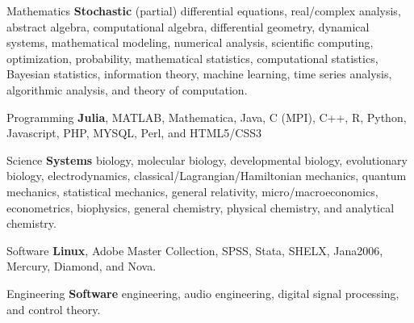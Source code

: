 

\begin{cvskills}
  
  \cvskill
  {Mathematics} %
  {{\bf \color{awesome} Stochastic}  (partial) differential equations, real/complex analysis,
  	abstract algebra, computational algebra, differential geometry, dynamical systems, mathematical modeling, numerical analysis, scientific computing, optimization, probability, mathematical statistics, computational statistics, Bayesian statistics, information theory, machine learning, time series analysis, algorithmic analysis, and theory of computation.} %

\cvskill
{Programming} %
{{\bf \color{awesome} Julia}, MATLAB, Mathematica, Java, C (MPI), C++, R, Python, Javascript, PHP, MYSQL, Perl, and HTML5/CSS3} %



\cvskill
{Science} %
{{\bf \color{awesome} Systems} biology, molecular biology, developmental biology, evolutionary biology, electrodynamics, classical/Lagrangian/Hamiltonian
	mechanics, quantum mechanics, statistical mechanics, general relativity, micro/macroeconomics, 
	econometrics, biophysics, general chemistry, physical chemistry, and analytical chemistry.} %


  \cvskill
    {Software} %
    {{\bf \color{awesome} Linux}, Adobe Master Collection, SPSS, Stata, SHELX, Jana2006, Mercury, Diamond, and Nova.} %


  \cvskill
  {Engineering} %
  {{\bf \color{awesome} Software} engineering, audio engineering, digital signal processing, and control theory.} %
  

\end{cvskills}
